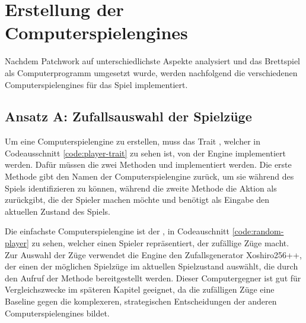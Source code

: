\chapter{Erstellung der Computerspielengines}
\label{chapter:erstellung-der-computerspielengines}

Nachdem Patchwork auf unterschiedlichste Aspekte analysiert und das Brettspiel als Computerprogramm umgesetzt wurde, werden nachfolgend die verschiedenen Computerspielengines für das Spiel implementiert.

\section{Ansatz A: Zufallsauswahl der Spielzüge}
\label{section:erstellung-ansatz-a}

Um eine Computerspielengine zu erstellen, muss das Trait , welcher in Codeausschnitt \ref{code:player-trait} zu sehen ist, von der Engine implementiert werden. Dafür müssen die zwei Methoden  und  implementiert werden. Die erste Methode gibt den Namen der Computerspielengine zurück, um sie während des Spiels identifizieren zu können, während die zweite Methode die Aktion als  zurückgibt, die der Spieler machen möchte und benötigt als Eingabe den aktuellen Zustand des Spiels.



Die einfachste Computerspielengine ist der , in Codeauschnitt \ref{code:random-player} zu sehen, welcher einen Spieler repräsentiert, der zufällige Züge macht. Zur Auswahl der Züge verwendet die Engine den Zufallsgenerator Xoshiro256++, der einen der möglichen Spielzüge im aktuellen Spielzustand  auswählt, die durch den Aufruf der Methode  bereitgestellt werden. Dieser Computergegner ist gut für Vergleichszwecke im späteren Kapitel  geeignet, da die zufälligen Züge eine Baseline gegen die komplexeren, strategischen Entscheidungen der anderen Computerspielengines bildet.



\pagebreak

